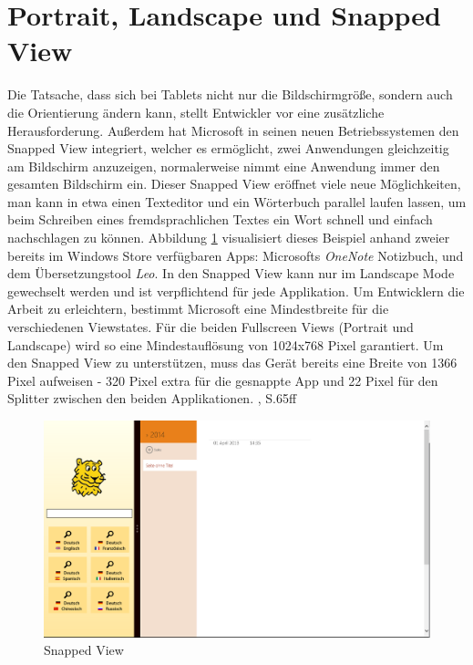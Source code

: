 \documentclass[a4paper,bibtotoc,oneside]{scrbook}
\begin{document}
\section[Portrait und Landscape]{Portrait, Landscape und Snapped View}
Die Tatsache, dass sich bei Tablets nicht nur die Bildschirmgröße, sondern auch die Orientierung ändern kann, stellt Entwickler vor eine zusätzliche Herausforderung. Außerdem hat Microsoft in seinen neuen Betriebssystemen den Snapped View integriert, welcher es ermöglicht, zwei Anwendungen gleichzeitig am Bildschirm anzuzeigen, normalerweise nimmt eine Anwendung immer den gesamten Bildschirm ein. Dieser Snapped View eröffnet viele neue Möglichkeiten, man kann in etwa einen Texteditor und ein Wörterbuch parallel laufen lassen, um beim Schreiben eines fremdsprachlichen Textes ein Wort schnell und einfach nachschlagen zu können. 
\newline
Abbildung \ref{Abb4} visualisiert dieses Beispiel anhand zweier bereits im Windows Store verfügbaren Apps: Microsofts \textit{OneNote} Notizbuch, und dem Übersetzungstool \textit{Leo}. In den Snapped View kann nur im Landscape Mode gewechselt werden und ist verpflichtend für jede Applikation.
\newline
\newline
Um Entwicklern die Arbeit zu erleichtern, bestimmt Microsoft eine Mindestbreite für die verschiedenen Viewstates. Für die beiden Fullscreen Views (Portrait und Landscape) wird so eine Mindestauflösung von 1024x768 Pixel garantiert. Um den Snapped View zu unterstützen, muss das Gerät bereits eine Breite von 1366 Pixel aufweisen - 320 Pixel extra für die gesnappte App und 22 Pixel für den Splitter zwischen den beiden Applikationen. \cite{ana12}, S.65ff
\begin{figure}[htbp]
\centering
\includegraphics[scale=0.4]{images/snapped.png}
\caption[Snapped View]{Snapped View}\label{Abb4}
\end{figure}
\end{document}
